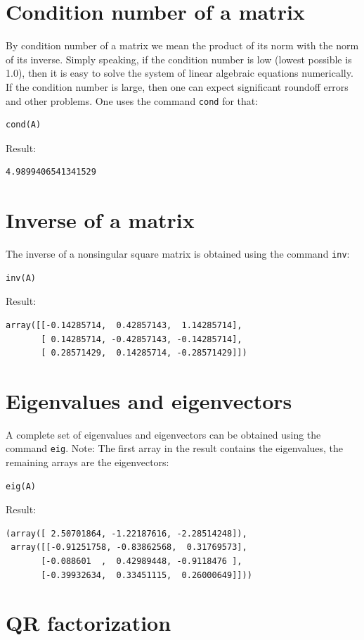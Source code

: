 \documentclass[article,A4,12pt]{llncs}
\begin{document}
\section{Condition number of a matrix}

By condition number of a matrix we mean the product of its norm with the 
norm of its inverse. Simply speaking, if the condition number is low
(lowest possible is 1.0), then it is easy to solve the system of linear
algebraic equations numerically. If the condition number is large, then
one can expect significant roundoff errors and other problems. One uses
the command {\tt cond} for that:
\begin{verbatim}
cond(A)
\end{verbatim}
Result:
\begin{verbatim}
4.9899406541341529
\end{verbatim}

\section{Inverse of a matrix}

The inverse of a nonsingular square matrix is obtained using the command {\tt inv}:
\begin{verbatim}
inv(A)
\end{verbatim}
Result:
\begin{verbatim}
array([[-0.14285714,  0.42857143,  1.14285714],
       [ 0.14285714, -0.42857143, -0.14285714],
       [ 0.28571429,  0.14285714, -0.28571429]])
\end{verbatim}

\section{Eigenvalues and eigenvectors}

A complete set of eigenvalues and eigenvectors can be obtained using the command {\tt eig}.
Note: The first array in the result contains the eigenvalues, the remaining arrays are the
eigenvectors:
\begin{verbatim}
eig(A)
\end{verbatim}
Result:
\begin{verbatim}
(array([ 2.50701864, -1.22187616, -2.28514248]), 
 array([[-0.91251758, -0.83862568,  0.31769573],
       [-0.088601  ,  0.42989448, -0.9118476 ],
       [-0.39932634,  0.33451115,  0.26000649]]))
\end{verbatim}

\section{QR factorization}
\end{document}
